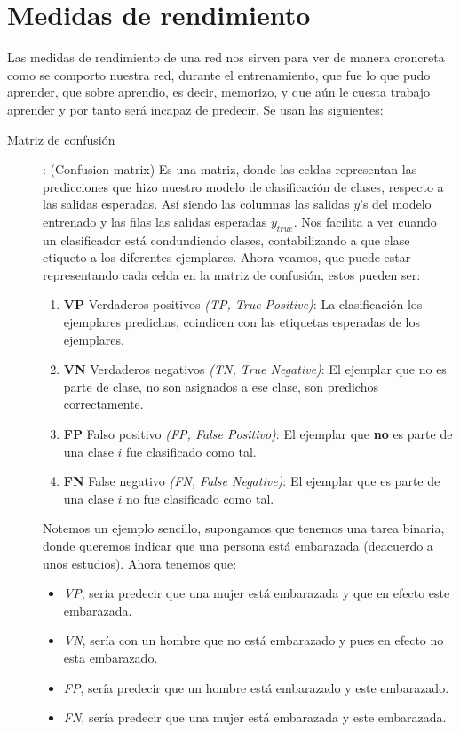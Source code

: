 \section{Medidas de rendimiento}

Las medidas de rendimiento de una red nos sirven para ver de manera croncreta como se comporto nuestra red, durante el entrenamiento, que fue lo que pudo aprender, que sobre aprendio, es decir, memorizo, y que aún le cuesta trabajo aprender y por tanto será incapaz de predecir. Se usan las siguientes:

\begin{description}
 \item [Matriz de confusión]: (Confusion matrix)
 Es una matriz, donde las celdas representan las predicciones que hizo nuestro modelo de clasificación de clases, respecto a las salidas esperadas. Así siendo las columnas las salidas $y$'s del modelo entrenado y las filas las salidas esperadas $y_{true}$. 
 Nos facilita a ver cuando un clasificador está condundiendo clases, contabilizando a que clase etiqueto a los diferentes ejemplares. Ahora veamos, que puede estar representando cada celda en la matriz de confusión, estos pueden ser:
 \begin{enumerate}
  \item \textbf{VP} Verdaderos positivos \emph{(TP, True Positive)}: La clasificación los ejemplares predichas, coindicen con las etiquetas esperadas de los ejemplares. 
  
  \item \textbf{VN} Verdaderos negativos \emph{(TN, True Negative)}: El ejemplar que no es parte de clase, no son asignados a ese clase, son predichos correctamente.
  
  \item \textbf{FP} Falso positivo \emph{(FP, False Positivo)}: El ejemplar que \textbf{no} es parte de una clase $i$ fue clasificado como tal.
  
  \item \textbf{FN} False negativo  \emph{(FN, False Negative)}: El ejemplar que es parte de una clase $i$ no fue clasificado como tal. 
 \end{enumerate}

  \begin{example}
   Notemos un ejemplo sencillo, supongamos que tenemos una tarea binaria, donde queremos indicar que una persona está
   embarazada (deacuerdo a unos estudios). Ahora tenemos que:

   \begin{itemize}
    \item \emph{VP}, sería predecir que una mujer está embarazada y que en efecto este embarazada. 
    \item \emph{VN}, sería con un hombre que no está embarazado y pues en efecto no esta embarazado.  
    \item \emph{FP}, sería predecir que un hombre está embarazado y  este embarazado.  
    \item \emph{FN}, sería predecir que una mujer  está embarazada y este embarazada. 
   \end{itemize}


\end{example}
\end{description}
